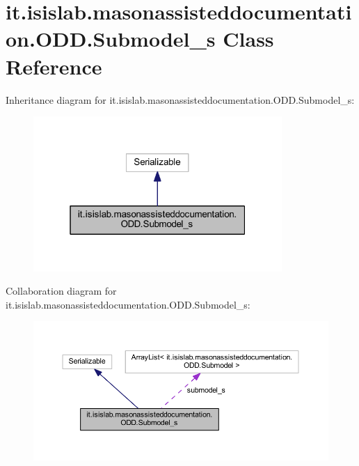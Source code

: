 \hypertarget{classit_1_1isislab_1_1masonassisteddocumentation_1_1_o_d_d_1_1_submodel__s}{\section{it.\-isislab.\-masonassisteddocumentation.\-O\-D\-D.\-Submodel\-\_\-s Class Reference}
\label{classit_1_1isislab_1_1masonassisteddocumentation_1_1_o_d_d_1_1_submodel__s}
}


Inheritance diagram for it.\-isislab.\-masonassisteddocumentation.\-O\-D\-D.\-Submodel\-\_\-s\-:
\nopagebreak
\begin{figure}[H]
\begin{center}
\leavevmode
\includegraphics[width=268pt]{classit_1_1isislab_1_1masonassisteddocumentation_1_1_o_d_d_1_1_submodel__s__inherit__graph}
\end{center}
\end{figure}


Collaboration diagram for it.\-isislab.\-masonassisteddocumentation.\-O\-D\-D.\-Submodel\-\_\-s\-:
\nopagebreak
\begin{figure}[H]
\begin{center}
\leavevmode
\includegraphics[width=350pt]{classit_1_1isislab_1_1masonassisteddocumentation_1_1_o_d_d_1_1_submodel__s__coll__graph}
\end{center}
\end{figure}
